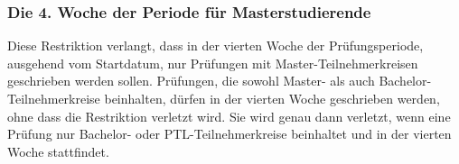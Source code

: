 \subsubsection{Die 4. Woche der Periode für Masterstudierende}
Diese Restriktion verlangt, dass in der vierten Woche der Prüfungsperiode,
ausgehend vom Startdatum, nur Prüfungen mit Master-Teilnehmerkreisen geschrieben werden sollen.
Prüfungen, die sowohl Master- als auch Bachelor-Teilnehmerkreise beinhalten, dürfen in der vierten
Woche geschrieben werden, ohne dass die Restriktion verletzt wird.
Sie wird genau dann verletzt, wenn eine Prüfung nur Bachelor- oder PTL-Teilnehmerkreise
beinhaltet und in der vierten Woche stattfindet.